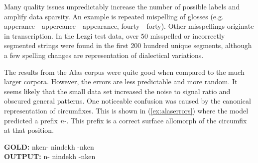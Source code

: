 Many quality issues unpredictably increase the number of possible labels and amplify data sparsity. An example is
repeated mispelling of glosses (e.g. apperance---appereance---appearance, fourty---forty). Other misspellings originate in transcription. In the Lezgi test data, over 50 misspelled or incorrectly segmented strings were found in the first 200 hundred unique segments, although a few spelling changes are representation of dialectical variations.  


The results from the Alas corpus were quite good when compared to the much larger corpora. However, the errors are less predictable and more random. It seems likely that the small data set increased the noise to signal ratio and obscured general patterns. 
One noticeable confusion was caused by the canonical representation of circumfixes. This is shown in (\ref{ex:alaserrors}) where the model predicted a prefix \textit{n-}. This prefix is a correct surface allomorph of the circumfix at that position. 

\pex   
\label{ex:alaserrors}
\a \textbf{GOLD:} \hspace{2mm} n\textlangle{}\textrangle{}ken- \hspace{1mm} nindekh \hspace{1mm} -n\textlangle{}\textrangle{}ken \\
\textbf{OUTPUT:} \hspace{2mm} n- \hspace{5mm} nindekh \hspace{2mm} -n\textlangle{}\textrangle{}ken
\xe



